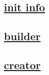 \documentclass{article}
\begin{document}
  


  \subsection{\href{../files/__init__-py.html}{init info}}
  \subsection{\href{../files/builder-py.html}{builder}}
  \subsection{\href{../files2/creator-py.html}{creator}}
\end{document}
